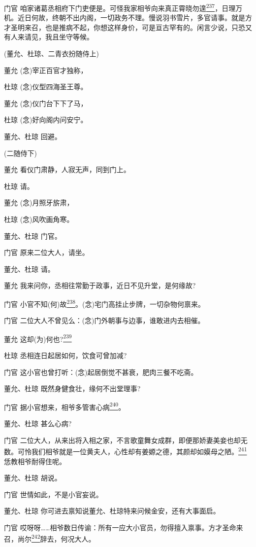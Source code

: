 门官
咱家诸葛丞相府下门吏便是。可怪我家相爷向来真正霄晓勿遑\protect\hyperlink{fn237}{\textsuperscript{237}}，日理万机。近日何故，终朝不出内阁，一切政务不理。慢说羽书雪片，多官请事。就是方才圣明来召，也是推病不起，你想这样身价，可是亘古罕有的。闲言少说，只恐又有人来请见，我且坐守等候。

(董允、杜琼、二青衣扮随侍上)

董允 (念)宰正百官才独称，

杜琼 (念)仪型四海圣王尊。

董允 (念)仪门台下下了马，

杜琼 (念)好向阁内问安宁。

董允、杜琼 回避。

(二随侍下)

董允 看仪门肃静，人寂无声，同到门上。

杜琼 请。

董允 (念)月照牙旂肃，

杜琼 (念)风吹画角寒。

董允、杜琼 门官。

门官 原来二位大人，请坐。

董允、杜琼 请。

董允 我来问你，丞相往常勤于政事，近日不见升堂，是何缘故?

门官
小官不知(何)故\protect\hyperlink{fn238}{\textsuperscript{238}}。(念)宅门高挂止步牌，一切杂物何禀来。

门官 二位大人不曾见么：(念)门外朝事与边事，谁敢进内去相催。

董允 这却(为)何也?\protect\hyperlink{fn239}{\textsuperscript{239}}

杜琼 丞相连日起居如何，饮食可曾加减?

门官 这小官也曾打听：(念)起居倒觉不甚衰，肥肉三餐不吃斋。

董允、杜琼 既然身健食壮，缘何不出堂理事?

门官
据小官想来，相爷多管害心病\protect\hyperlink{fn240}{\textsuperscript{240}}。

董允、杜琼 甚么心病?

门官
二位大人，从来出将入相之家，不言歌童舞女成群，即便那娇妻美妾也却无数。可怜我们相爷就是一位黄夫人，心性却有姜嫄之德，其颜却如嫫母之陋。\protect\hyperlink{fn241}{\textsuperscript{241}}恁教相爷耐得住呢。

董允、杜琼 胡说。

门官 世情如此，不是小官妄说。

董允、杜琼 你可进去禀知说董允、杜琼特来问候金安，还有大事面启。

门官
哎呀呀\ldots{}\ldots{}相爷数日传谕：所有一应大小官员，勿得擅入禀事。方才圣命来召，尚尔\protect\hyperlink{fn242}{\textsuperscript{242}}辞去，何况大人。

